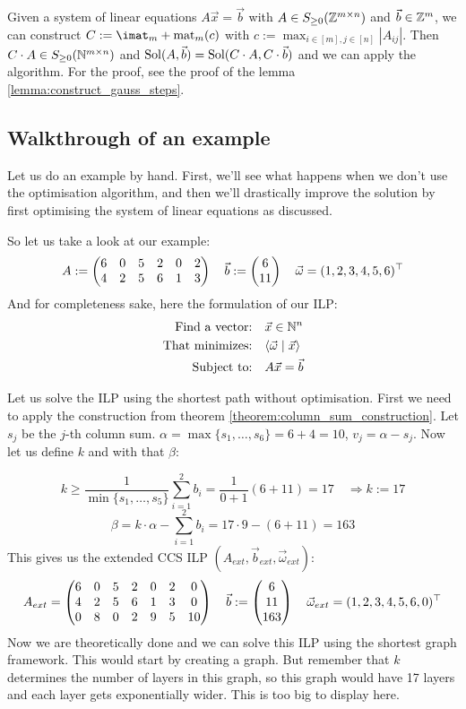 Given a system of linear equations $A\vec x = \vec b$ with $A \in S_{\geq 0}(\mathbb{Z}^{m \times n})$ and $\vec b \in \mathbb{Z}^{m}$, we can construct $C := \imat_m + \opmat_m(c)$ with $c := \max_{i\in[m], j\in[n]} |A_{ij}|$. Then $C \cdot A \in S_{\geq 0}(\mathbb{N}^{m \times n})$ and $\operatorname{Sol}(A, \vec b) = \operatorname{Sol}(C\cdot A, C\cdot \vec b)$ and we can apply the algorithm. For the proof, see the proof of the lemma \ref{lemma:construct_gauss_steps}.
   
\subsection{Walkthrough of an example}
Let us do an example by hand. First, we'll see what happens when we don't use the optimisation algorithm, and then we'll drastically improve the solution by first optimising the system of linear equations as discussed.

So let us take a look at our example:
$$A:= \left(\begin{matrix}6&0&5&2&0&2\\4&2&5&6&1&3\end{matrix}\right)\quad\vec b:= \left(\begin{matrix}6\\11\end{matrix}\right) \quad \vec\omega = (1, 2, 3, 4, 5, 6)^\top$$
And for completeness sake, here the formulation of our ILP:
\begin{align*}
    \text{Find a vector:} & \quad \vec x \in \mathbb{N}^n \\
    \text{That minimizes:} & \quad \langle \vec \omega \mid \vec x \rangle\\
    \text{Subject to:} & \quad A\vec x = \vec b \\
\end{align*}

Let us solve the ILP using the shortest path without optimisation. First we need to apply the construction from theorem \ref{theorem:column_sum_construction}. Let $s_j$ be the $j$-th column sum. $\alpha = \max\{s_1, \dots, s_6\} = 6+4=10$, $v_j = \alpha - s_j$. Now let us define $k$ and with that $\beta$:

$$k \geq \frac{1}{\min\{s_1, \dots, s_5\}} \sum_{i=1}^{2}b_i = \frac{1}{0+1}(6+11) = 17 \quad \Rightarrow k := 17$$ 
$$\beta = k\cdot\alpha - \sum_{i=1}^{2}b_i = 17\cdot9-(6+11) = 163$$
This gives us the extended CCS ILP $(A_{ext}, \vec b_{ext}, \vec\omega_{ext})$:
$$A_{ext} = \left(\begin{matrix}6&0&5&2&0&2&0\\4&2&5&6&1&3&0\\0&8&0&2&9&5&10\end{matrix}\right)\quad\vec b:= \left(\begin{matrix}6\\11\\163\end{matrix}\right)\quad \vec\omega_{ext} = (1, 2, 3, 4, 5, 6, 0)^\top$$
Now we are theoretically done and we can solve this ILP using the shortest graph framework. This would start by creating a graph. But remember that $k$ determines the number of layers in this graph, so this graph would have 17 layers and each layer gets exponentially wider. This is too big to display here.

